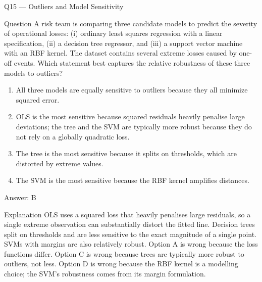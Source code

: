 \documentclass[aspectratio=169,8pt]{beamer}
\begin{document}
	
	\begin{frame}{Q15 --- Outliers and Model Sensitivity}
		\begin{block}{Question}
			A risk team is comparing three candidate models to predict the severity of operational losses: (i) ordinary least squares regression with a linear specification, (ii) a decision tree regressor, and (iii) a support vector machine with an RBF kernel. The dataset contains several extreme losses caused by one-off events. Which statement best captures the relative robustness of these three models to outliers?
		\end{block}
		\begin{enumerate}
			\item All three models are equally sensitive to outliers because they all minimize squared error.
			\item OLS is the most sensitive because squared residuals heavily penalise large deviations; the tree and the SVM are typically more robust because they do not rely on a globally quadratic loss.
			\item The tree is the most sensitive because it splits on thresholds, which are distorted by extreme values.
			\item The SVM is the most sensitive because the RBF kernel amplifies distances.
		\end{enumerate}
		\begin{exampleblock}{Answer: B}\end{exampleblock}
		\begin{block}{Explanation}
			OLS uses a squared loss that heavily penalises large residuals, so a single extreme observation can substantially distort the fitted line. Decision trees split on thresholds and are less sensitive to the exact magnitude of a single point. SVMs with margins are also relatively robust. Option A is wrong because the loss functions differ. Option C is wrong because trees are typically more robust to outliers, not less. Option D is wrong because the RBF kernel is a modelling choice; the SVM's robustness comes from its margin formulation.
		\end{block}
	\end{frame}
	
\end{document}
